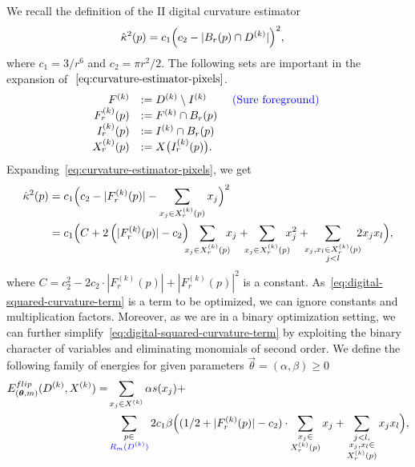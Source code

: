 We recall the definition of the II digital curvature estimator 
\begin{align}
	\hat{\kappa}^2(p) &= c_1\Big( c_2 - | B_r(p) \cap D^{(k)} | \Big)^2, 
	\label{eq:curvature-estimator-pixels}
\end{align}
where $c_1=3/r^6$ and $c_2=\pi r^2/2$. 
%
The following sets are important in the expansion of $~\cref{eq:curvature-estimator-pixels}$.
\begin{align*}
	\begin{array}{rll}
	F^{(k)} &:= D^{(k)} \setminus I^{(k)} & \text{ {\color{blue}{(Sure foreground) }}} \\
	F_r^{(k)}(p) &:= F^{(k)} \cap B_r(p) &\\
	I_r^{(k)}(p) &:= I^{(k)} \cap B_r(p) & \\
	X_r^{(k)}(p) &:= X\big( I_r^{(k)}(p) \big). & \\	
	\end{array}
\end{align*}
%
%
Expanding~\cref{eq:curvature-estimator-pixels}, we get 
\begin{align}
  \hat{\kappa}^2(p) &= c_1\Big( c_2 - |F_{r}^{(k)}(p)| - \sum_{x_j \in X_r^{(k)}(p)} {x_j} \Big)^2 \nonumber \\
   &= c_1 \Big( C + 2\left( |F_{r}^{(k)}(p)| - c_2 \right) \hspace{-2mm}\sum_{x_j \in X_{r}^{(k)}(p)}\hspace{-2mm}{x_j} + \hspace{-2mm}\sum_{x_j \in X_{r}^{(k)}(p)}\hspace{-2mm}{x_j^2} + \hspace{-2mm}\sum_{ \substack{x_j,x_l \in X_{r}^{(k)}(p) \\ j<l} }\hspace{-2mm}{2x_jx_l}  \Big),
   \label{eq:digital-squared-curvature-term}
\end{align}
where $C=c_2^2 - 2c_2 \cdot |F_{r}^{(k)}(p)| + |F_{r}^{(k)}(p)|^2$ is a constant. As~\cref{eq:digital-squared-curvature-term} is a term to be optimized, we can ignore constants and multiplication factors. Moreover, as we are in a binary optimization setting, we can  further simplify~\cref{eq:digital-squared-curvature-term} by exploiting the binary character of variables and eliminating monomials of second order. We define the following family
of energies for given parameters $\vec{\theta}=(\alpha,\beta ) \geq 0$ 
\begin{align}
  E_{(\bm{\theta},m)}^{flip}(D^{(k)},X^{(k)}) =& \sum_{x_j \in X^{(k)}}{\alpha s(x_j)} + \nonumber \\ 
  & \sum_{ \substack{p \in \\ {\color{blue}{R_m(D^{(k)})}}}}{ 2c_1 \beta  \Big( { (1/2+ |F_{r}^{(k)}(p)|-c_2) \cdot \sum_{ \substack{ x_j \in \\ X_{r}^{(k)}(p)}}{x_j} } + \sum_{ \substack{j<l, \\ x_j,x_l \in \\ X_{r}^{(k)}(p) } }{x_jx_l} \Big) },
  \label{eq:energy-family}
\end{align}
